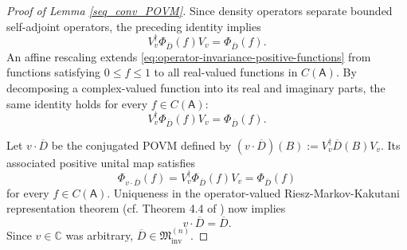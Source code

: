 \documentclass{article}
\theoremstyle{named}
\theoremstyle{named1}
\newcommand{\bbC}{\mathbb C}
\newcommand{\cM}{\mathfrak M}
\theoremstyle{plain}
\theoremstyle{remark}
\begin{document}
\begin{proof}[Proof of Lemma \ref{seq_conv_POVM}]
Since density operators separate bounded self-adjoint operators,
the preceding identity implies
\begin{equation}
    V_v^\dagger
    \Phi_{\overline D}(f)
    V_v
    =
    \Phi_{\overline D}(f).
    \label{eq:operator-invariance-positive-functions}
\end{equation}
An affine rescaling extends
\eqref{eq:operator-invariance-positive-functions} from functions satisfying
\(0\leq f\leq1\) to all real-valued functions in \(C(\mathsf A)\). By
decomposing a complex-valued function into its real and imaginary parts, the
same identity holds for every \(f\in C(\mathsf A)\):
\begin{equation}
    V_v^\dagger
    \Phi_{\overline D}(f)
    V_v
    =
    \Phi_{\overline D}(f).
    \label{eq:operator-invariance-all-functions}
\end{equation}

Let \(v\cdot\overline D\) be the conjugated POVM defined by
$
    (v\cdot\overline D)(B)
    :=
    V_v^\dagger\overline D(B)V_v.
$
Its associated positive unital map satisfies
\begin{equation}
    \Phi_{v\cdot\overline D}(f)
    =
    V_v^\dagger
    \Phi_{\overline D}(f)
    V_v
    =
    \Phi_{\overline D}(f)
    \label{eq:equality-positive-unital-maps}
\end{equation}
for every \(f\in C(\mathsf A)\). Uniqueness in the operator-valued Riesz-Markov-Kakutani representation theorem (cf. Theorem 4.4 of \cite{Quantum_Measurements_2016}) now implies
\begin{equation}
    v\cdot\overline D=\overline D.
    \label{eq:limiting-povm-invariant-one-v}
\end{equation}
Since \(v\in\bbC\) was arbitrary,
$\overline D\in\cM_{\mathrm{inv}}^{(n)}.$
\end{proof}
\end{document}
